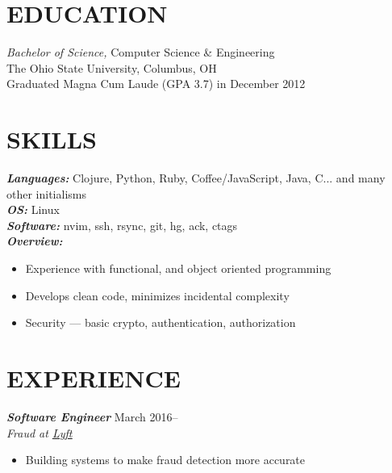\documentclass[line,letterpaper]{resume}
\begin{document}
\address{\href{http://www.ryan@ryanmcg.com}{Personal website --- www.ryanmcg.com}}
\address{\href{mailto:ryan@ryanmcg.com}{ryan@ryanmcg.com}}


\begin{resume}
    \vspace{-24pt}
    \section{\uppercase{Education}} {\sl Bachelor of Science,} \/
    Computer Science \& Engineering \\
    The Ohio State University, Columbus, OH \\
    Graduated Magna Cum Laude (GPA 3.7) in December 2012 \\

    \vspace{-20pt}

    \section{\uppercase{Skills}}
    {\sl\textbf{Languages:}}\/
    Clojure, Python, Ruby, Coffee/JavaScript, Java, C... and many other initialisms \\
    {\sl\textbf{OS:}}\/ Linux \\
    {\sl\textbf{Software:}}\/ nvim, ssh, rsync, git, hg, ack, ctags \\
    {\sl\textbf{Overview:}}
    \begin{itemize}
        \item Experience with functional, and object oriented programming
        \item Develops clean code, minimizes incidental complexity
        \item Security --- basic crypto, authentication, authorization
    \end{itemize}

    \vspace{-6pt}

    \section{\uppercase{Experience}}

    {\sl\textbf{Software Engineer}} \hfill March 2016--\\
    \emph{Fraud at
    \underline{\href{https://www.lyft.com/}{Lyft}}}
    \begin{itemize}
        \item Building systems to make fraud detection more accurate
    \end{itemize}
    \vspace{-6pt}


\end{resume}
\end{document}
